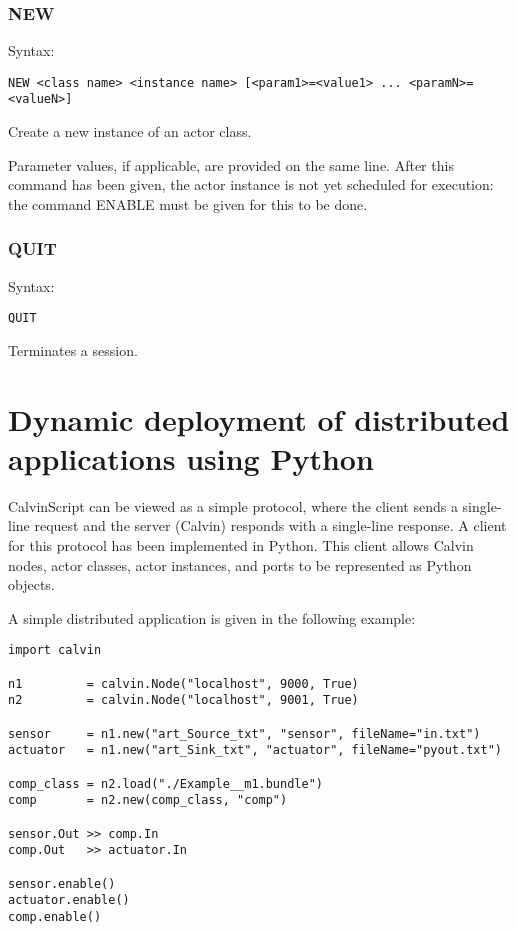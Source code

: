\documentclass[10pt, a4paper]{article}
\begin{document}
\subsubsection*{NEW}

Syntax:
\begin{verbatim}
NEW <class name> <instance name> [<param1>=<value1> ... <paramN>=<valueN>]
\end{verbatim}

Create a new instance of an actor class.

Parameter values, if applicable, are provided on the same line. After this command has been given, the actor instance is not yet scheduled for execution: the command ENABLE must be given for this to be done.

\subsubsection*{QUIT}

Syntax:
\begin{verbatim}
QUIT
\end{verbatim}

Terminates a session.

\section{Dynamic deployment of distributed applications using Python}

CalvinScript can be viewed as a simple protocol, where the client
sends a single-line request and the server (Calvin) responds with a
single-line response. A client for this protocol has been implemented
in Python. This client allows Calvin nodes, actor classes, actor
instances, and ports to be represented as Python objects.

A simple distributed application is given in the following example:

\begin{verbatim}
import calvin

n1         = calvin.Node("localhost", 9000, True)
n2         = calvin.Node("localhost", 9001, True)

sensor     = n1.new("art_Source_txt", "sensor", fileName="in.txt")
actuator   = n1.new("art_Sink_txt", "actuator", fileName="pyout.txt")

comp_class = n2.load("./Example__m1.bundle")
comp       = n2.new(comp_class, "comp")

sensor.Out >> comp.In
comp.Out   >> actuator.In

sensor.enable()
actuator.enable()
comp.enable()
\end{verbatim}
\end{document}
